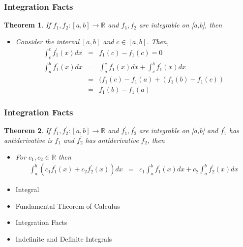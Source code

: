 \documentclass{beamer}
\newtheorem{thm}{Theorem}
\numberwithin{equation}{section}
\begin{document}
\begin{frame}
\frametitle{Integration Facts}

\begin{thm} If $f_{1}, f_{2}: [a,b] \rightarrow \mathbb{R}$ and $f_{1}, f_{2} $ are integrable on [a,b], then
\begin{itemize}
\item[i)] Consider the interval $[a,b]$ and $c \in [a,b]$.  Then, 
\begin{eqnarray}
\int_{c}^{c}f^{'}_{1}(x) dx & = & f_{1}(c) - f_{1}(c) = 0 \nonumber \\
\int_{a}^{b} f^{'}_{1} (x) dx & = & \int_{a}^{c} f^{'}_{1} (x) dx + \int_{c}^{b} f^{'}_{1}(x)dx \nonumber \\
										& = & (f_{1} (c) - f_{1}(a) +  (f_{1}(b) - f_{1}(c) ) \nonumber \\
										& = & f_{1}(b) - f_{1}(a) \nonumber 
\end{eqnarray}										  
\end{itemize}

\end{thm}

\end{frame}



\begin{frame}
\frametitle{Integration Facts}

\begin{thm} If $f_{1}^{'}, f_{2}^{'}: [a,b] \rightarrow\mathbb{R}$ and $f_{1}^{'}, f_{2}^{'} $ are integrable on [a,b] and $f_1^{'}$ has antiderivative is $f_1$ and $f_2^{'}$ has antiderivative $f_2$, then
\begin{itemize}
\item[ii)] For $c_{1}, c_{2} \in \mathbb{R}$ then
\begin{eqnarray}
\int_{a}^{b} (c_{1} f_{1}^{'}(x) + c_{2} f_{2}^{'}(x) ) dx & = & c_{1} \int_{a}^{b} f_{1}^{'}(x)dx  + c_{2} \int_{a}^{b}f_{2}^{'}(x) dx \nonumber 
\end{eqnarray}
\end{itemize}
\end{thm}

\end{frame}



\begin{frame}

\begin{itemize}
\item \textcolor{mygray}{Integral}
\item \textcolor{mygray}{Fundamental Theorem of Calculus}
\item \textcolor{mygray}{Integration Facts}
\item \textcolor{myblack}{Indefinite and Definite Integrals}
\end{itemize}

\end{frame}
\end{document}
